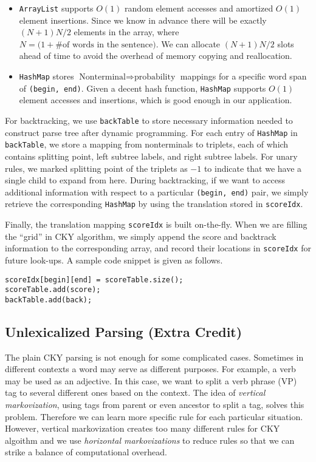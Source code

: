 \documentclass[letterpaper]{article}
\begin{document}
\begin{itemize}
\item \texttt{ArrayList} supports $O(1)$ random element accesses and amortized $O(1)$ element insertions. Since we know in advance there will be exactly $(N+1) N / 2$ elements in the array, where $N = \Big( 1 + \#\textrm{of words in the sentence} \Big)$. We can allocate $(N+1) N/2$ slots ahead of time
to avoid the overhead of memory copying and reallocation.

\item \texttt{HashMap} stores $\textrm{Nonterminal} \Longrightarrow \textrm{probability}$ mappings for a specific word span of \texttt{(begin, end)}. Given a decent hash function, \texttt{HashMap} supports $O(1)$ element accesses and insertions, which is good enough in our application.
\end{itemize}

For backtracking, we use \texttt{backTable} to store necessary information needed to construct parse tree after dynamic programming.
For each entry of \texttt{HashMap} in \texttt{backTable}, we store a mapping from nonterminals to triplets, each of which contains splitting point, left subtree labels, and right subtree labels.
For unary rules, we marked splitting point of the triplets as $-1$ to indicate that we have a single child to expand from here.
During backtracking, if we want to access additional information with respect to a particular \texttt{(begin, end)} pair, we simply retrieve the corresponding \texttt{HashMap} by using the translation stored in \texttt{scoreIdx}.

\vspace{0.25cm}

Finally, the translation mapping \texttt{scoreIdx} is built on-the-fly.
When we are filling the ``grid'' in CKY algorithm, we simply append the score and backtrack information to the corresponding array, and record their locations in \texttt{scoreIdx} for future look-ups. A sample code snippet is given as follows.
\begin{verbatim}
scoreIdx[begin][end] = scoreTable.size();
scoreTable.add(score);
backTable.add(back);
\end{verbatim}

\subsection{Unlexicalized Parsing (Extra Credit)}
The plain CKY parsing is not enough for some complicated cases. Sometimes in different contexts a word may serve as different purposes. For example, a verb may be used as an adjective. In this case, we want to split a verb phrase (VP) tag to several different ones based on the context. The idea of \textit{vertical markovization}, using tags from parent or even ancestor to split a tag, solves this problem. Therefore we can learn more specific rule for each particular situation.
However, vertical markovization creates too many different rules for CKY algoithm and we use \textit{horizontal markovizations} to reduce rules so that we can strike a balance of computational overhead. 
\end{document}
